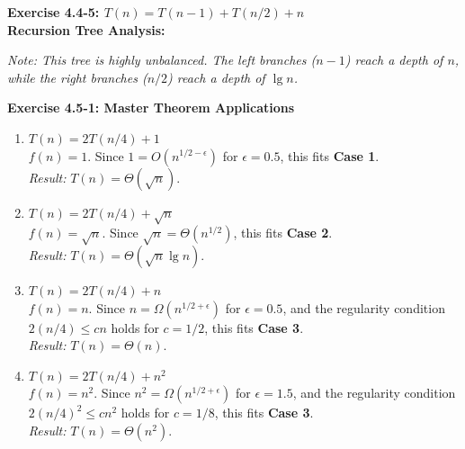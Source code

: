 \documentclass{article}
\theoremstyle{theorem}
\theoremstyle{definition}
\theoremstyle{remark}
\begin{document}
\vspace{2em}

\textbf{Exercise 4.4-5: $T(n) = T(n-1) + T(n/2) + n$} \\
\textbf{Recursion Tree Analysis:}
\begin{center}
\end{center}
\textit{Note: This tree is highly unbalanced. The left branches ($n-1$) reach a depth of $n$, while the right branches ($n/2$) reach a depth of $\lg n$.}

\textbf{Exercise 4.5-1: Master Theorem Applications}

\begin{enumerate}[label=\alph*.]
    \item \textbf{$T(n) = 2T(n/4) + 1$} \\
    $f(n) = 1$. Since $1 = O(n^{1/2 - \epsilon})$ for $\epsilon = 0.5$, this fits \textbf{Case 1}. \\
    \textit{Result:} $T(n) = \Theta(\sqrt{n})$.

    \item \textbf{$T(n) = 2T(n/4) + \sqrt{n}$} \\
    $f(n) = \sqrt{n}$. Since $\sqrt{n} = \Theta(n^{1/2})$, this fits \textbf{Case 2}. \\
    \textit{Result:} $T(n) = \Theta(\sqrt{n} \lg n)$.

    \item \textbf{$T(n) = 2T(n/4) + n$} \\
    $f(n) = n$. Since $n = \Omega(n^{1/2 + \epsilon})$ for $\epsilon = 0.5$, and the regularity condition $2(n/4) \leq cn$ holds for $c=1/2$, this fits \textbf{Case 3}. \\
    \textit{Result:} $T(n) = \Theta(n)$.

    \item \textbf{$T(n) = 2T(n/4) + n^2$} \\
    $f(n) = n^2$. Since $n^2 = \Omega(n^{1/2 + \epsilon})$ for $\epsilon = 1.5$, and the regularity condition $2(n/4)^2 \leq cn^2$ holds for $c=1/8$, this fits \textbf{Case 3}. \\
    \textit{Result:} $T(n) = \Theta(n^2)$.
\end{enumerate}
\end{document}
